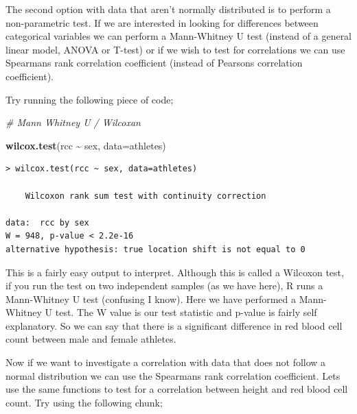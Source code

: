 \documentclass[
]{book}
\newenvironment{Shaded}{\begin{snugshade}}{\end{snugshade}}
\newcommand{\AttributeTok}[1]{\textcolor[rgb]{0.13,0.29,0.53}{#1}}
\newcommand{\CommentTok}[1]{\textcolor[rgb]{0.56,0.35,0.01}{\textit{#1}}}
\newcommand{\FunctionTok}[1]{\textcolor[rgb]{0.13,0.29,0.53}{\textbf{#1}}}
\newcommand{\NormalTok}[1]{#1}
\newcommand{\OtherTok}[1]{\textcolor[rgb]{0.56,0.35,0.01}{#1}}
\newcommand{\SpecialCharTok}[1]{\textcolor[rgb]{0.81,0.36,0.00}{\textbf{#1}}}
\newcommand{\StringTok}[1]{\textcolor[rgb]{0.31,0.60,0.02}{#1}}
\begin{document}
The second option with data that aren't normally distributed is to perform a non-parametric test. If we are interested in looking for differences between categorical variables we can perform a Mann-Whitney U test (instead of a general linear model, ANOVA or T-test) or if we wish to test for correlations we can use Spearmans rank correlation coefficient (instead of Pearsons correlation coefficient).

Try running the following piece of code;

\begin{Shaded}
\begin{Highlighting}[]
\CommentTok{\# Mann Whitney U / Wilcoxan }

\FunctionTok{wilcox.test}\NormalTok{(rcc }\SpecialCharTok{\textasciitilde{}}\NormalTok{ sex, }\AttributeTok{data=}\NormalTok{athletes) }
\end{Highlighting}
\end{Shaded}

\begin{verbatim}
> wilcox.test(rcc ~ sex, data=athletes) 

    Wilcoxon rank sum test with continuity correction

data:  rcc by sex
W = 948, p-value < 2.2e-16
alternative hypothesis: true location shift is not equal to 0
\end{verbatim}

This is a fairly easy output to interpret. Although this is called a Wilcoxon test, if you run the test on two independent samples (as we have here), R runs a Mann-Whitney U test (confusing I know). Here we have performed a Mann-Whitney U test. The W value is our test statistic and p-value is fairly self explanatory. So we can say that there is a significant difference in red blood cell count between male and female athletes.

Now if we want to investigate a correlation with data that does not follow a normal distribution we can use the Spearmans rank correlation coefficient. Lets use the same functions to test for a correlation between height and red blood cell count. Try using the following chunk;

\begin{Shaded}
\end{Shaded}
\end{document}
